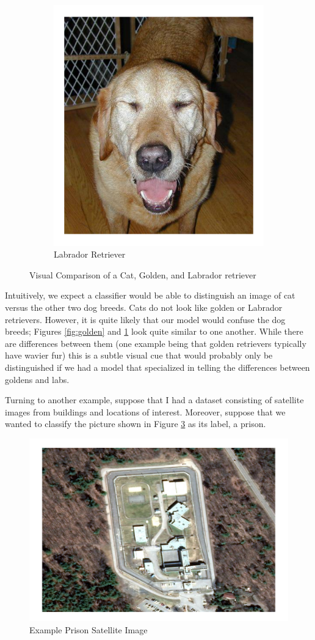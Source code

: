 \documentclass[draft, ../thesis.tex]{subfiles}
\begin{document}
\begin{figure}
\begin{subfigure}[b]{.3\linewidth}
    		\includegraphics[width=.7\linewidth]{images/lab}
    		\caption{Labrador Retriever}
    		\label{fig:lab}
    	\end{subfigure}
    	\caption{Visual Comparison of a Cat, Golden, and Labrador retriever}
    	\label{fig:animal_compare}
    \end{figure}

    Intuitively, we expect a classifier would be able to distinguish an image of
    cat versus the other two dog breeds. Cats do not look like golden or
    Labrador retrievers. However, it is quite likely that our model would
    confuse the dog breeds; Figures \ref{fig:golden} and \ref{fig:lab} look
    quite similar to one another. While there are differences between them (one
    example being that golden retrievers typically have wavier fur) this is a
    subtle visual cue that would probably only be distinguished if we had a
    model that specialized in telling the differences between goldens and labs.

    Turning to another example, suppose that I had a dataset consisting of
    satellite images from buildings and locations of interest. Moreover, suppose
    that we wanted to classify the picture shown in Figure \ref{fig:prison01rgb}
    as its label, a prison.

    \begin{figure}
    	\centering
    	\includegraphics[width=0.7\linewidth]{images/prison}
    	\caption{Example Prison Satellite Image}
    	\label{fig:prison01rgb}
    \end{figure}
\end{document}
